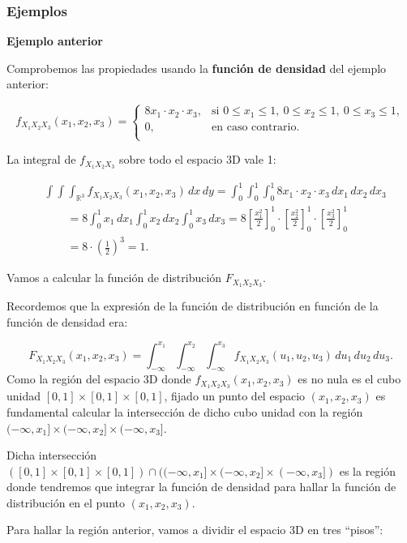\documentclass[
  letterpaper,
  DIV=11,
  numbers=noendperiod]{scrreprt}
\begin{document}
\hypertarget{ejemplos-10}{%
\subsubsection{Ejemplos}\label{ejemplos-10}}

\textbf{Ejemplo anterior}

Comprobemos las propiedades usando la \textbf{función de densidad} del
ejemplo anterior:

\[
f_{X_1X_2X_3}(x_1,x_2,x_3)=\begin{cases}
8 x_1\cdot x_2\cdot x_3, & \mbox{si }0\leq x_1\leq 1,\ 0\leq x_2\leq 1,\ 0\leq x_3\leq 1, \\
0, & \mbox{en caso contrario.}\\
\end{cases}
\]

La integral de \(f_{X_1X_2X_3}\) sobre todo el espacio 3D vale 1:

\[
\begin{array}{rl}
& \int\int\int_{\mathbb{R}^3} f_{X_1X_2X_3}(x_1,x_2,x_3)\,dx\, dy=\int_0^1\int_0^1\int_0^1 8 x_1\cdot x_2\cdot x_3\, dx_1\,dx_2\,dx_3\\ & \qquad=8\int_0^1 x_1\, dx_1\int_0^1 x_2\, dx_2\int_0^1 x_3\,dx_3=8\left[\frac{x_1^2}{2}\right]_0^1\cdot\left[\frac{x_2^2}{2}\right]_0^1\cdot \left[\frac{x_3^2}{2}\right]_0^1\\
& \qquad = 8\cdot\left(\frac{1}{2}\right)^3 =1.
\end{array}
\]

Vamos a calcular la función de distribución \(F_{X_1X_2X_3}\).

Recordemos que la expresión de la función de distribución en función de
la función de densidad era:

\[
F_{X_1X_2X_3}(x_1,x_2,x_3)=\int_{-\infty}^{x_1}\int_{-\infty}^{x_2}\int_{-\infty}^{x_3}f_{X_1X_2X_3}(u_1,u_2,u_3)\,du_1\, du_2\, du_3.
\] Como la región del espacio 3D donde \(f_{X_1X_2X_3}(x_1,x_2,x_3)\) es
no nula es el cubo unidad \([0,1]\times [0,1]\times [0,1]\), fijado un
punto del espacio \((x_1,x_2,x_3)\) es fundamental calcular la
intersección de dicho cubo unidad con la región
\((-\infty,x_1]\times (-\infty,x_2]\times (-\infty,x_3]\).

Dicha intersección
\(([0,1]\times [0,1]\times [0,1])\cap ((-\infty,x_1]\times (-\infty,x_2]\times (-\infty,x_3])\)
es la región donde tendremos que integrar la función de densidad para
hallar la función de distribución en el punto \((x_1,x_2,x_3)\).

Para hallar la región anterior, vamos a dividir el espacio 3D en tres
``pisos'':
\end{document}
